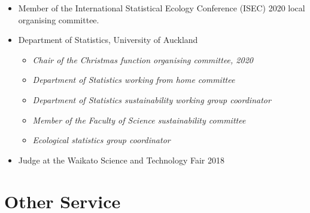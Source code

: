 \documentclass[10pt,a4paper]{moderncv}
\begin{document}
\begin{itemize}
\item Member of the International Statistical Ecology Conference (ISEC) 2020 local organising committee.
\item Department of Statistics, University of Auckland
  \begin{itemize}
  \item \textit{Chair of the Christmas function organising committee, 2020}
  \item \textit{Department of Statistics working from home committee}
  \item \textit{Department of Statistics sustainability working group coordinator}
  \item \textit{Member of the Faculty of Science sustainability committee}
  \item \textit{Ecological statistics group coordinator}
  \end{itemize}
\item Judge at the Waikato Science and Technology Fair 2018
\end{itemize}



\section{Other Service}

\vspace{6pt}
\end{document}
